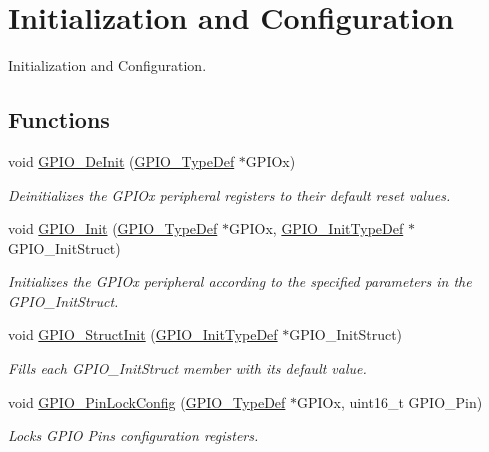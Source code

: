 \hypertarget{group___g_p_i_o___group1}{}\section{Initialization and Configuration}
\label{group___g_p_i_o___group1}


Initialization and Configuration.  


\subsection*{Functions}
\begin{DoxyCompactItemize}
\item 
void \hyperlink{group___g_p_i_o___group1_gaa60bdf3182c44b5fa818f237042f52ee}{G\+P\+I\+O\+\_\+\+De\+Init} (\hyperlink{struct_g_p_i_o___type_def}{G\+P\+I\+O\+\_\+\+Type\+Def} $\ast$G\+P\+I\+Ox)
\begin{DoxyCompactList}\small\item\em Deinitializes the G\+P\+I\+Ox peripheral registers to their default reset values. \end{DoxyCompactList}\item 
void \hyperlink{group___g_p_i_o___group1_ga71abf9404261370d03cca449b88d3a65}{G\+P\+I\+O\+\_\+\+Init} (\hyperlink{struct_g_p_i_o___type_def}{G\+P\+I\+O\+\_\+\+Type\+Def} $\ast$G\+P\+I\+Ox, \hyperlink{struct_g_p_i_o___init_type_def}{G\+P\+I\+O\+\_\+\+Init\+Type\+Def} $\ast$G\+P\+I\+O\+\_\+\+Init\+Struct)
\begin{DoxyCompactList}\small\item\em Initializes the G\+P\+I\+Ox peripheral according to the specified parameters in the G\+P\+I\+O\+\_\+\+Init\+Struct. \end{DoxyCompactList}\item 
void \hyperlink{group___g_p_i_o___group1_gab28de41278e7f8c63d0851e2733b10df}{G\+P\+I\+O\+\_\+\+Struct\+Init} (\hyperlink{struct_g_p_i_o___init_type_def}{G\+P\+I\+O\+\_\+\+Init\+Type\+Def} $\ast$G\+P\+I\+O\+\_\+\+Init\+Struct)
\begin{DoxyCompactList}\small\item\em Fills each G\+P\+I\+O\+\_\+\+Init\+Struct member with its default value. \end{DoxyCompactList}\item 
void \hyperlink{group___g_p_i_o___group1_gad2f2e615928c69fd0d8c641a7cedaafc}{G\+P\+I\+O\+\_\+\+Pin\+Lock\+Config} (\hyperlink{struct_g_p_i_o___type_def}{G\+P\+I\+O\+\_\+\+Type\+Def} $\ast$G\+P\+I\+Ox, uint16\+\_\+t G\+P\+I\+O\+\_\+\+Pin)
\begin{DoxyCompactList}\small\item\em Locks G\+P\+IO Pins configuration registers. \end{DoxyCompactList}\end{DoxyCompactItemize}


